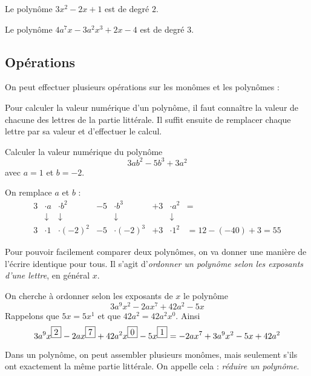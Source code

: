\begin{exemple}
Le polynôme $3x^2 - 2x + 1$ est de degré $2$.

Le polynôme $4a^7 x - 3a^2 x^3 + 2x -4$ est de degré $3$.
\end{exemple}

\subsection{Opérations}

On peut effectuer plusieurs opérations sur les monômes et les polynômes :

\begin{definition}
Pour calculer la valeur numérique d'un polynôme, il faut conna\^itre la valeur de chacune des lettres de la partie littérale. Il suffit ensuite de remplacer chaque lettre par sa valeur et d'effectuer le calcul.
\end{definition}

\begin{exemple}
Calculer la valeur numérique du polynôme
$$
3ab^2 -5b^3 +3 a^2
$$
avec $a=1$ et $b=-2$.

On remplace $a$ et $b$ :
$$
\begin{array}{cccccccl}
3 &\cdot a &\cdot b^2 & -5 &\cdot b^3 & +3 &\cdot a^2 & =\\
 & \downarrow & \downarrow & & \downarrow & & \downarrow & \\
3 &\cdot 1 &\cdot (-2)^2 &- 5 &\cdot (-2)^3 &+ 3 &\cdot 1^2 & = 12 - (-40) + 3 = 55
\end{array}
$$
\end{exemple}

\begin{definition}
Pour pouvoir facilement comparer deux polynômes, on va donner une manière de l'écrire identique pour tous. Il s'agit d'\emph{ordonner un polynôme selon les exposants d'une lettre}, en général $x$. 
\end{definition}

\begin{exemple}
On cherche à ordonner selon les exposants de $x$ le polynôme
$$
3a^9 x^2 - 2 a x^7 + 42 a^2 - 5 x
$$
Rappelons que $5x = 5x^1$ et que $42 a^2 = 42 a^2 x^0$. Ainsi 
$$
3a^9 x^{\fbox{2}} - 2 a x^{\fbox{7}} + 42 a^2 x^{\fbox{0}} - 5 x^{\fbox{1}} = -2ax^7+3a^9 x^2 -5x + 42a^2
$$
\end{exemple}

\begin{definition}
Dans un polynôme, on peut assembler plusieurs monômes, mais seulement s'ils ont exactement la même partie littérale. On appelle cela : \emph{réduire un polynôme}.
\end{definition}

